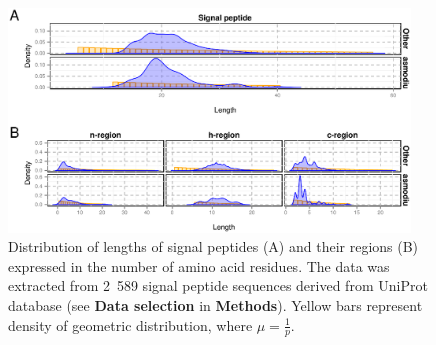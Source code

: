 \documentclass[10pt,letterpaper]{article}
\begin{document}
\begin{figure}[ht]\centering
\includegraphics[width=0.95\textwidth]{figures/reglen.eps}
\caption{Distribution of lengths of signal peptides (A) and their regions (B) expressed in the number of amino acid residues. The data was extracted from 2~589 signal peptide sequences derived from UniProt database (see \textbf{Data selection} in \textbf{Methods}). Yellow bars represent density of geometric distribution, where $\mu = \frac{1}{p}$.}
\label{fig:reglen}
\end{figure}

\end{document}
